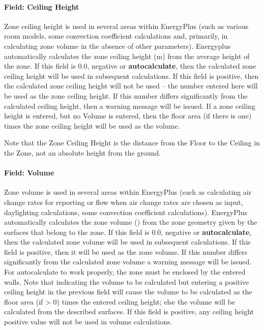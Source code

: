 \paragraph{Field: Ceiling Height}\label{field-ceiling-height}

Zone ceiling height is used in several areas within EnergyPlus (such as various room models, some convection coefficient calculations and, primarily, in calculating zone volume in the absence of other parameters). Energyplus automatically calculates the zone ceiling height (m) from the average height of the zone. If this field is 0.0, negative or \textbf{autocalculate}, then the calculated zone ceiling height will be used in subsequent calculations. If this field is positive, then the calculated zone ceiling height will not be used -- the number entered here will be used as the zone ceiling height. If this number differs significantly from the calculated ceiling height, then a warning message will be issued. If a zone ceiling height is entered, but no Volume is entered, then the floor area (if there is one) times the zone ceiling height will be used as the volume.

Note that the Zone Ceiling Height is the distance from the Floor to the Ceiling in the Zone, not an absolute height from the ground.

\paragraph{Field: Volume}\label{field-volume}

Zone volume is used in several areas within EnergyPlus (such as calculating air change rates for reporting or flow when air change rates are chosen as input, daylighting calculations, some convection coefficient calculations). EnergyPlus automatically calculates the zone volume (\SI{}{\volume}) from the zone geometry given by the surfaces that belong to the zone. If this field is 0.0, negative or \textbf{autocalculate}, then the calculated zone volume will be used in subsequent calculations. If this field is positive, then it will be used as the zone volume. If this number differs significantly from the calculated zone volume a warning message will be issued. For autocalculate to work properly, the zone must be enclosed by the entered walls. Note that indicating the volume to be calculated but entering a positive ceiling height in the previous field will cause the volume to be calculated as the floor area (if \textgreater{} 0) times the entered ceiling height; else the volume will be calculated from the described surfaces. If this field is positive, any ceiling height positive value will not be used in volume calculations.

